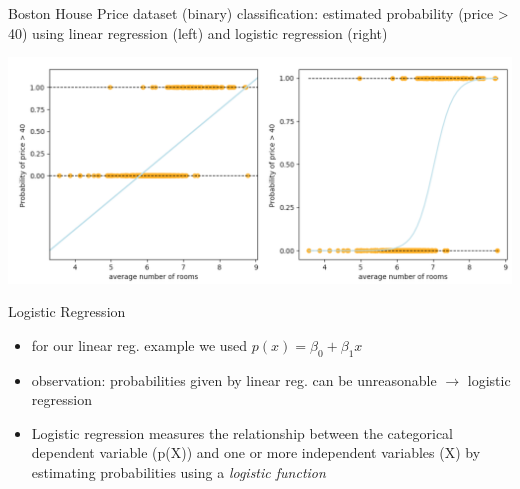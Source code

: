 \documentclass{beamer}
\begin{document}
\begin{frame}{Boston House Price dataset}
(binary) classification: estimated probability (price > 40) using linear regression (left) and logistic regression (right)\\
\begin{center}
\includegraphics[width=1\textwidth]{log_linear_comparison}\\
\end{center}
\end{frame}


\begin{frame}{Logistic Regression}
\begin{itemize}
\item for our linear reg. example we used $p(x) = \beta_0 + \beta_1x$
\item observation: probabilities given by linear reg. can be unreasonable $\rightarrow$ logistic regression
\item Logistic regression measures the relationship between the categorical dependent variable (p(X)) and one or more independent variables (X) by estimating probabilities using a \emph{logistic function}
\end{itemize}
\end{frame}
\end{document}
